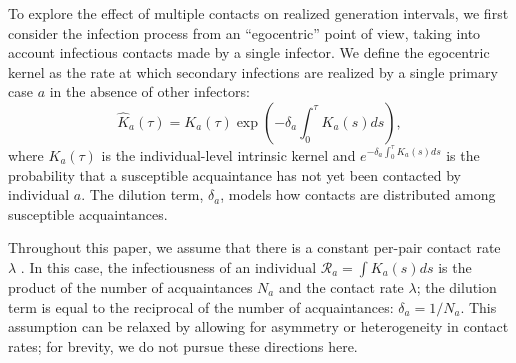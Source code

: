 \documentclass[12pt]{article}
\newcommand{\RR}{\ensuremath{{\mathcal R}}}
\begin{document}
To explore the effect of multiple contacts on realized generation intervals, we first consider the infection process from an ``egocentric'' point of view, taking into account infectious contacts made by a single infector.
We define the egocentric kernel as the rate at which secondary infections are realized by a single primary case $a$ in the absence of other infectors:
\begin{equation}
\hat{K}_a(\tau) = K_a(\tau) \exp \left(- \delta_a \int_0^\tau K_a(s) ds\right),
\end{equation}
where $K_a(\tau)$ is the individual-level intrinsic kernel and $e^{- \delta_a \int_0^\tau K_a(s) ds}$ is the probability that a susceptible acquaintance has not yet been contacted by individual $a$.
The dilution term, $\delta_a$, models how contacts are distributed among susceptible acquaintances.

Throughout this paper, we assume that there is a constant per-pair contact rate $\lambda$ \citep{trapman2016inferring}.
In this case, the infectiousness of an individual $\RR_a = \int K_a(s) ds$ is the product of the number of acquaintances $N_a$ and the contact rate $\lambda$; the dilution term is equal to the reciprocal of the number of acquaintances: $\delta_a = 1/N_a$.
This assumption can be relaxed by allowing for asymmetry \citep{trapman2016inferring} or heterogeneity \citep{ball1997epidemics, ball2002general} in contact rates; 
for brevity, we do not pursue these directions here.
\end{document}
